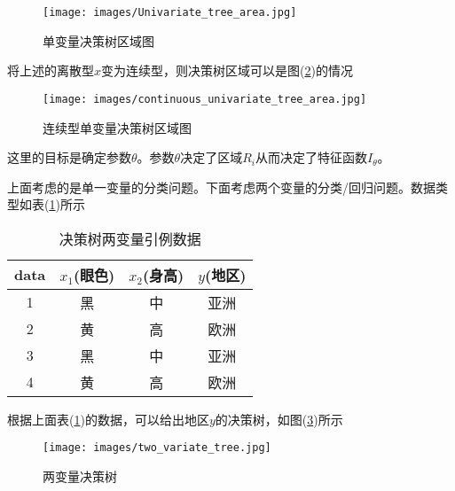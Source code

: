                 \begin{figure}[H]
                \centering
                \texttt{[image: images/Univariate\_tree\_area.jpg]}
                \caption{单变量决策树区域图}
                \label{fig:单变量决策树区域图}
                \end{figure}
        \par
        将上述的离散型$x$变为连续型，则决策树区域可以是图(\ref{fig:连续型单变量决策树区域图})的情况
                \begin{figure}[H]
                \centering
                \texttt{[image: images/continuous\_univariate\_tree\_area.jpg]}
                \caption{连续型单变量决策树区域图}
                \label{fig:连续型单变量决策树区域图}
                \end{figure}
        \noindent 这里的目标是确定参数$\theta$。参数$\theta$决定了区域$R_i$从而决定了特征函数$I_\theta$。
        \par
        上面考虑的是单一变量的分类问题。下面考虑两个变量的分类/回归问题。数据类型如表(\ref{决策树两变量引例数据})所示
        \begin{table}[H]
          \caption{决策树两变量引例数据}
          \label{决策树两变量引例数据}
          \centering
          \begin{tabular}{c|ccc}
          \toprule
          data   & $x_1$(眼色)    & $x_2$(身高)    & $y$(地区) \\
          \midrule
          1      & 黑      & 中      & 亚洲 \\
          2      & 黄      & 高      & 欧洲 \\
          3      & 黑      & 中      & 亚洲 \\
          4      & 黄      & 高      & 欧洲 \\
          \bottomrule
          \end{tabular}
        \end{table}
        根据上面表(\ref{决策树两变量引例数据})的数据，可以给出地区$y$的决策树，如图(\ref{fig:两变量决策树})所示
                \begin{figure}[H]
                \centering
                \texttt{[image: images/two\_variate\_tree.jpg]}
                \caption{两变量决策树}
                \label{fig:两变量决策树}
                \end{figure}
